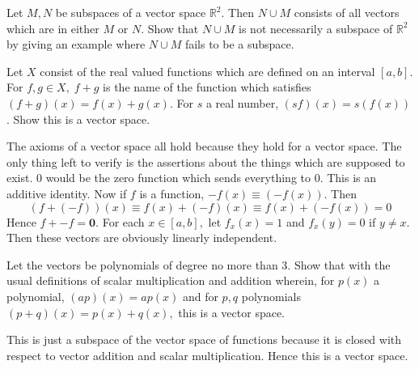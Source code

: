 \documentclass{ximera}
\begin{document}
\begin{problem}\label{prb:10.19} Let $M,N$ be subspaces of a vector space $\mathbb{R}^{2}.$ Then $N\cup
M$ consists of all vectors which are in either $M$ or $N$. Show that $N\cup
M $ is not necessarily a subspace of $\mathbb{R}^{2}$ by giving an example
where $N\cup M$ fails to be a subspace.
\end{problem}


\begin{problem}\label{prb:10.20} \label{4julyprob1}Let $X$ consist of the real valued functions which
are defined on an interval $\left[ a,b\right] .$ For $f,g\in X,\;f+g$ is the
name of the function which satisfies $\left( f+g\right) \left( x\right)
=f\left( x\right) +g\left( x\right)$. For $s$ a real number, $
\left( s f\right) \left( x\right) = s \left( f\left( x\right)
\right) $. Show this is a vector space.
\begin{hint}
The axioms of a vector space all hold because they
hold for a vector space. The only thing left to verify is the
assertions about the things which are supposed to exist. $0$ would
be the zero function which sends everything to $0$. This is an additive
identity. Now if $f$ is a function, $-f\left( x\right) \equiv \left(
-f\left( x\right) \right) $. Then
\[
\left( f+\left( -f\right) \right) \left( x\right) \equiv f\left( x\right)
+\left( -f\right) \left( x\right) \equiv f\left( x\right) +\left( -f\left(
x\right) \right) =0
\]
Hence $f+-f=\mathbf{0}$. For each $x\in \left[ a,b\right] ,$ let $%
f_{x}\left( x\right) =1$ and $f_{x}\left( y\right) =0$ if $y\neq x.$ Then
these vectors are obviously linearly independent.
\end{hint}
\end{problem}



\begin{problem}\label{prb:10.22} Let the vectors be polynomials of degree no more than 3. Show that
with the usual definitions of scalar multiplication and addition wherein,
for $p\left( x\right) $ a polynomial, $\left( a p\right) \left(
x\right) = a p\left( x\right) $ and for $p,q$ polynomials $\left(
p+q\right) \left( x\right) =  p\left( x\right) +q\left( x\right) ,$ this
is a vector space.
\begin{hint}
This is just a subspace of the vector space of functions
because it is closed with respect to vector addition and scalar
multiplication. Hence this is a vector space.
\end{hint}
\end{problem}
\end{document}
